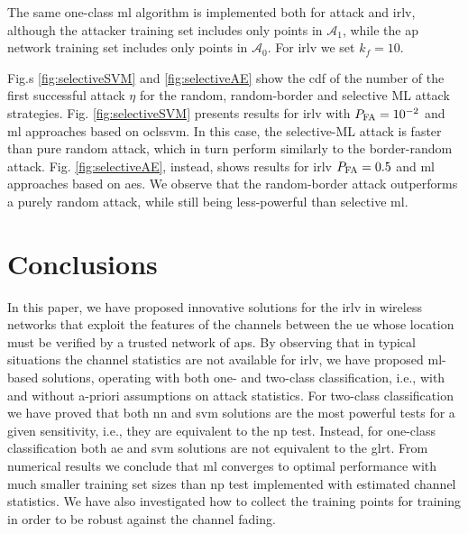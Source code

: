 \documentclass[draftcls,onecolumn,12pt]{IEEEtran}
\begin{document}
{The same one-class \ac{ml} algorithm is implemented both for attack and \ac{irlv}, although the attacker training set includes only points in $\mathcal A_1$, while the \ac{ap} network training set includes only  points in $\mathcal A_0$. For  \ac{irlv}  we set $k_f=10$.

Fig.s \ref{fig:selectiveSVM} and \ref{fig:selectiveAE} show the \ac{cdf} of the number of the first successful attack $\eta$ for the random, random-border and selective ML attack strategies. Fig. \ref{fig:selectiveSVM} presents results for \ac{irlv} with $P_{\rm FA}=10^{-2}$ and \ac{ml} approaches based on \ac{oclssvm}. In this case, the selective-ML attack is faster than pure random attack, which in turn perform similarly to the border-random  attack.  Fig. \ref{fig:selectiveAE}, instead, shows results for  \ac{irlv} $P_{\rm FA} =0.5$ and \ac{ml} approaches based on \acp{ae}. We observe that the random-border attack outperforms a purely random attack, while still being less-powerful than selective \ac{ml}. 




\section{Conclusions}

In this paper, we have proposed innovative solutions for the \ac{irlv} in wireless networks that exploit the features of the channels between the \ac{ue} whose location must be verified by a trusted network of \acp{ap}. By observing that in typical situations the channel statistics are not available for \ac{irlv}, we have proposed \ac{ml}-based solutions, operating with both one- and two-class classification, i.e., with and without a-priori assumptions on attack statistics. For two-class classification we have proved that  both \ac{nn} and \ac{svm} solutions  are the most powerful tests for a given sensitivity, i.e., they are equivalent to the \ac{np} test. Instead, for one-class classification both \ac{ae} and \ac{svm} solutions are not equivalent to the \ac{glrt}. From numerical results we conclude that \ac{ml} converges to optimal performance with much smaller training set sizes than \ac{np} test implemented with estimated channel statistics. We have also investigated how to collect the training points for training in order to be robust against the channel fading.

}
\end{document}
